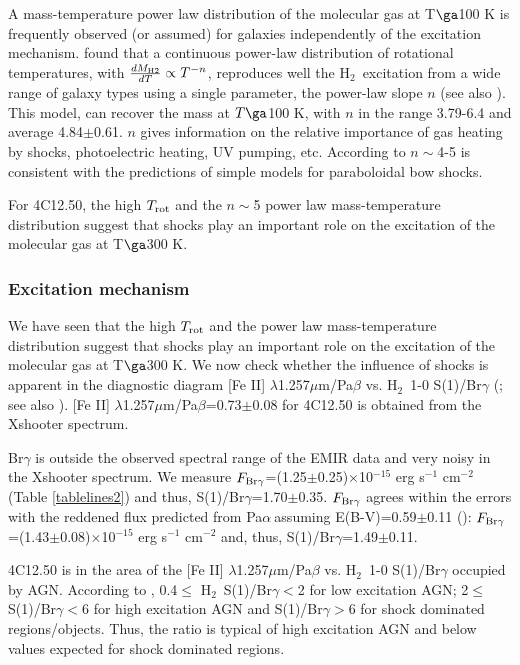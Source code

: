 \documentclass{aa}
\newcommand{\pa}{Pa$\alpha~$}
\newcommand{\hmol}{H$_2$~}
\begin{document}
 A mass-temperature power law distribution of the molecular gas at T$\ga$100 K  is frequently observed (or assumed) for galaxies independently of the excitation mechanism.   \cite{Togi2016} found that  a continuous power-law distribution of rotational temperatures, with $\frac{d M_{\rm H2}}{dT}\propto T^{-n}$,  reproduces well the \hmol excitation from a wide range of galaxy types using a single  parameter, the power-law slope $n$ (see also \citealt{Pereira2014}).   This model, can recover the mass at $T\ga$100 K,  with  $n$ in the range 3.79-6.4 and average 4.84$\pm$0.61.  $n$ gives information on the relative importance of gas heating by shocks, photoelectric heating, UV pumping, etc. According to \cite{Neufeld2008} $n\sim$4-5  is consistent with the predictions of simple models for paraboloidal bow shocks.


 For 4C12.50, the high $T_{\rm rot}$ and the $n\sim$5 power law mass-temperature distribution suggest that shocks play an important role on the excitation of the molecular gas  at T$\ga$300 K.


\subsubsection{Excitation mechanism}
\label{excitmol}



We have seen that the high $T_{\rm rot}$ and the power law mass-temperature distribution suggest that shocks play an important role on the excitation of the molecular gas at T$\ga$300 K. We now check whether the influence of shocks is apparent in the  diagnostic diagram [Fe II] $\lambda$1.257$\mu$m/Pa$\beta$   vs. \hmol 1-0 S(1)/Br$\gamma$ (\citealt{Larkin1998,Ardila2005,Riffel2021}; see also \citealt{Colina2015}).   [Fe II] $\lambda$1.257$\mu$m/Pa$\beta$=0.73$\pm$0.08 for 4C12.50 is obtained from the Xshooter spectrum.

 Br$\gamma$ is outside the observed spectral range of the EMIR data and very noisy in the Xshooter spectrum. We measure $F_{\rm Br\gamma}$=(1.25$\pm$0.25)$\times$10$^{-15}$  erg 
s$^{-1}$ cm$^{-2}$ (Table \ref{tablelines2}) and thus,   S(1)/Br$\gamma$=1.70$\pm$0.35.  $F_{\rm Br\gamma}$ agrees  within the errors with the reddened flux  predicted from \pa assuming E(B-V)=0.59$\pm$0.11 (\citealt{Holt2003,Rose2018}): $F_{\rm Br\gamma}$=(1.43$\pm$0.08)$\times$10$^{-15}$  erg  s$^{-1}$ cm$^{-2}$ and, thus, S(1)/Br$\gamma$=1.49$\pm$0.11. 
 
4C12.50 is in the  area of the  [Fe II] $\lambda$1.257$\mu$m/Pa$\beta$   vs. \hmol 1-0 S(1)/Br$\gamma$ occupied by AGN.    According to \cite{Riffel2021},  0.4$\le$ \hmol  S(1)/Br$\gamma<$2 for low excitation AGN; 2$\le$  S(1)/Br$\gamma<$6 for high excitation AGN and S(1)/Br$\gamma>$6 for shock dominated regions/objects. Thus, the ratio  is typical of high excitation AGN and below values expected for shock dominated regions.
\end{document}
